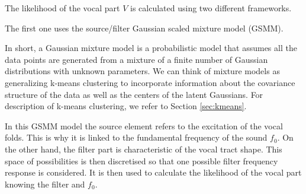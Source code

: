 The likelihood of the vocal part $V$ is calculated using two different frameworks. 

The first one uses the source/filter Gaussian scaled mixture model (GSMM). 

In short, a Gaussian mixture model is a probabilistic model that assumes all the data points are generated from a mixture of a finite number of Gaussian distributions with unknown parameters. We can think of mixture models as generalizing k-means clustering to incorporate information about the covariance structure of the data as well as the centers of the latent Gaussians. For description of k-means clustering, we refer to Section \ref{sec:kmeans}.

In this GSMM model the source element refers to the excitation of the vocal folds. This is why it is linked to the fundamental frequency of the sound $f_{\text{0}}$. On the other hand, the filter part is characteristic of the vocal tract shape. This space of possibilities is then discretised so that one possible filter frequency response is considered. It is then used to calculate the likelihood of the vocal part knowing the filter and $f_{\text{0}}$.

